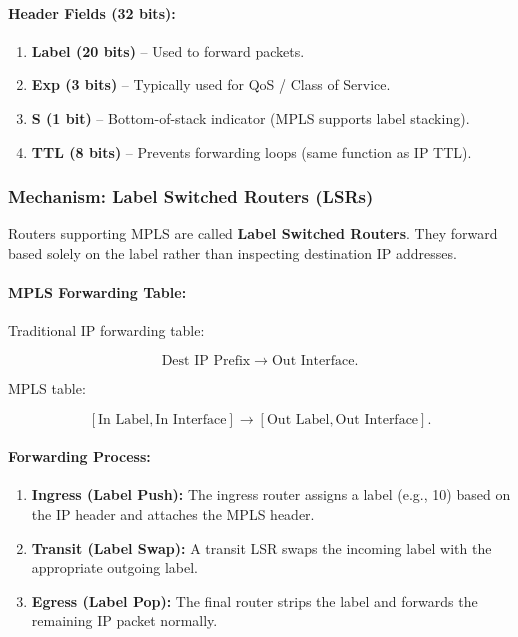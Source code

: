 \documentclass[12pt]{article}
\begin{document}
\paragraph{Header Fields (32 bits):}

\begin{enumerate}
    \item \textbf{Label (20 bits)} – Used to forward packets.
    \item \textbf{Exp (3 bits)} – Typically used for QoS / Class of Service.
    \item \textbf{S (1 bit)} – Bottom-of-stack indicator (MPLS supports label stacking).
    \item \textbf{TTL (8 bits)} – Prevents forwarding loops (same function as IP TTL).
\end{enumerate}

\subsubsection{Mechanism: Label Switched Routers (LSRs)}

Routers supporting MPLS are called \textbf{Label Switched Routers}. They forward based solely on the label rather than inspecting destination IP addresses.

\paragraph{MPLS Forwarding Table:}

Traditional IP forwarding table:

\[
    \text{Dest IP Prefix} \rightarrow \text{Out Interface}.
\]

MPLS table:

\[
    [\text{In Label}, \text{In Interface}] \rightarrow [\text{Out Label}, \text{Out Interface}].
\]

\paragraph{Forwarding Process:}

\begin{enumerate}
    \item \textbf{Ingress (Label Push):}
          The ingress router assigns a label (e.g., 10) based on the IP header and attaches the MPLS header.
    \item \textbf{Transit (Label Swap):}
          A transit LSR swaps the incoming label with the appropriate outgoing label.
    \item \textbf{Egress (Label Pop):}
          The final router strips the label and forwards the remaining IP packet normally.
\end{enumerate}
\end{document}
